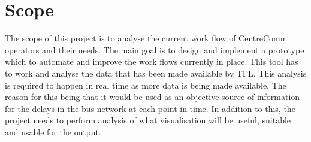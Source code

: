 
\section{Scope}
The scope of this project is to analyse the current work flow of CentreComm operators and their needs. The main goal is to design and implement a prototype which to automate and improve the work flows currently in place. This tool has to work and analyse the data that has been made available by TFL. This analysis is required to happen in real time as more data is being made available. The reason for this being that it would be used as an objective source of information for the delays in the bus network at each point in time. In addition to this, the project needs to perform analysis of what visualisation will be useful, suitable and usable for the output.


